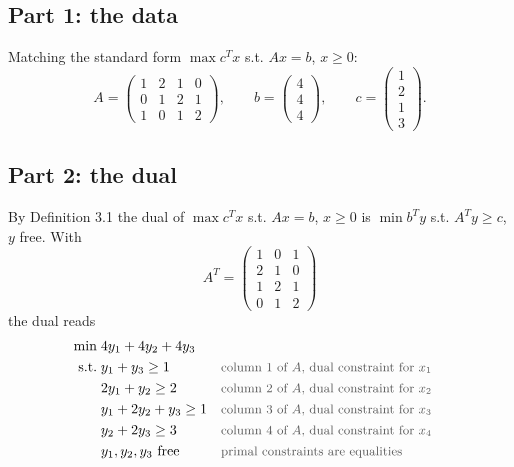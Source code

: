 \documentclass[a4paper,11pt]{article}
\newif\ifexplain
\newcommand{\teil}[1]{\subsection*{#1}}
\newcommand{\why}[1]{\text{\small\color{black!65}#1}}
\newcommand{\explain}[1]{\ifexplain\begin{erklbox}#1\end{erklbox}\fi}
\begin{document}
\teil{Part 1: the data}
Matching the standard form $\max c^Tx$ s.t. $Ax=b$, $x\ge 0$:
\[
A = \begin{pmatrix}1&2&1&0\\0&1&2&1\\1&0&1&2\end{pmatrix},\qquad b = \begin{pmatrix}4\\4\\4\end{pmatrix},\qquad c = \begin{pmatrix}1\\2\\1\\3\end{pmatrix}.
\]

\teil{Part 2: the dual}
By Definition 3.1 the dual of $\max c^Tx$ s.t. $Ax=b$, $x\ge0$ is $\min b^Ty$ s.t. $A^Ty\ge c$, $y$ free. With
\[
A^T = \begin{pmatrix}1&0&1\\2&1&0\\1&2&1\\0&1&2\end{pmatrix}
\]
the dual reads
\begin{align*}
\min\;& 4y_1 + 4y_2 + 4y_3\\
\text{s.t.}\;& y_1 + y_3 \ge 1 && \why{column 1 of $A$, dual constraint for $x_1$}\\
& 2y_1 + y_2 \ge 2 && \why{column 2 of $A$, dual constraint for $x_2$}\\
& y_1 + 2y_2 + y_3 \ge 1 && \why{column 3 of $A$, dual constraint for $x_3$}\\
& y_2 + 2y_3 \ge 3 && \why{column 4 of $A$, dual constraint for $x_4$}\\
& y_1, y_2, y_3 \text{ free} && \why{primal constraints are equalities}
\end{align*}
\explain{Die Dualisierung tauscht die Rollen: Jede der drei primalen Gleichungen erzeugt eine freie duale Variable $y_i$, jede der vier primalen Variablen erzeugt eine duale Ungleichung (Spalte von $A$ transponiert). Die rechte Seite $b$ wird zur dualen Zielfunktion, der Kostenvektor $c$ zur rechten Seite der dualen Ungleichungen.}
\end{document}
